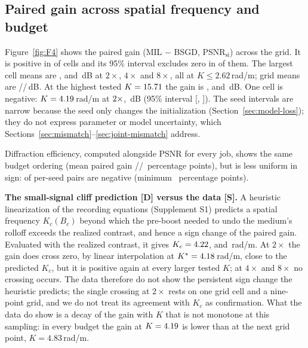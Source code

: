 \documentclass{optica-article}
\begin{document}
\subsection{Paired gain across spatial frequency and budget}
\label{sec:no-cliff}
Figure~\ref{fig:F4} shows the paired gain (MIL $-$ BSGD, PSNR$_{\text{si}}$)
across the grid. It is positive in \MOneNPositive{} of \MOneNCells{} cells
and its 95\% interval excludes zero in \MOneNCIAboveZero{} of them. The
largest cell means are \MaxGainTwoX, \MaxGainFourX{} and \MaxGainEightX\,dB
at $2\times$, $4\times$ and $8\times$, all at $K\le2.62$\,rad/\textmu m;
grid means are \MeanGainTwoX/\MeanGainFourX/\MeanGainEightX\,dB. At the
highest tested $K=15.71$ the gain is \GainHighKTwoX, \GainHighKFourX{}
and \GainHighKEightX\,dB. One cell is negative: $K=4.19$\,rad/\textmu m
at $2\times$, \MOneNegGain\,dB (95\% interval
[\MOneNegCILo, \MOneNegCIHi]). The seed intervals are narrow because the
seed only changes the initialization (Section~\ref{sec:model-loss}); they
do not express parameter or model uncertainty, which
Sections~\ref{sec:mismatch}--\ref{sec:joint-mismatch} address.

Diffraction efficiency, computed alongside PSNR for every job, shows the
same budget ordering (mean paired gain
\DEMeanGainTwoX/\DEMeanGainFourX/\DEMeanGainEightX\ percentage points), but
is less uniform in sign: \DENNegative{} of \DENPairs{} per-seed pairs are
negative (minimum \DEMinGainAllBudgets\ percentage points).

\textbf{The small-signal cliff prediction [D] versus the data [S].} A
heuristic linearization of the recording equations (Supplement S1) predicts a
spatial frequency $K_c(B_c)$ beyond which the pre-boost needed to undo the
medium's rolloff exceeds the realized contrast, and hence a sign change of
the paired gain. Evaluated with the realized contrast, it gives
$K_c=4.22$, \KcPredFourX{} and \KcPredEightX\,rad/\textmu m. At
$2\times$ the gain does cross zero, by linear interpolation at
$K^*=4.18$\,rad/\textmu m, close to the predicted $K_c$, but it
is positive again at every larger tested $K$; at $4\times$ and $8\times$ no
crossing occurs. The data therefore do not show the persistent sign change
the heuristic predicts; the single crossing at $2\times$ rests on one grid
cell and a nine-point grid, and we do not treat its agreement with $K_c$ as
confirmation. What the data do show is a decay of the gain with $K$ that is
not monotone at this sampling: in every budget the gain at
$K=4.19$ is lower than at the next grid point, $K=4.83$\,rad/\textmu m.
\end{document}
